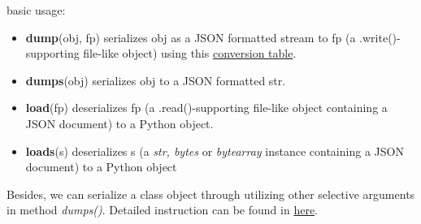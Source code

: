 basic usage:
\begin{itemize}
\item \textbf{dump}(obj, fp) serializes obj as a JSON formatted stream to fp (a .write()-supporting file-like object) using this \href{https://docs.python.org/3.6/library/json.html#py-to-json-table}{conversion table}.
\item \textbf{dumps}(obj) serializes obj to a JSON formatted str.
\item \textbf{load}(fp) deserializes fp (a .read()-supporting file-like object containing a JSON document) to a Python object.
\item \textbf{loads}(s) deserializes s (a \textit{str, bytes} or \textit{bytearray} instance containing a JSON document) to a Python object
\end{itemize}
Besides, we can serialize a class object through utilizing other selective arguments in method \textit{dumps()}. Detailed instruction can be found in \href{https://docs.python.org/3/library/json.html#json.dumps}{here}.